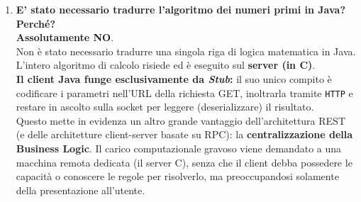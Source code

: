 \documentclass[11pt]{article}
\begin{document}
\begin{tcolorbox}[colback=green!5!white,colframe=green!75!black,title=\textbf{RISPOSTA}, breakable]
\begin{enumerate}
    \item \textbf{E' stato necessario tradurre l'algoritmo dei numeri primi in Java? Perché?}\\
    \textbf{Assolutamente NO}.\\
    Non è stato necessario tradurre una singola riga di logica matematica in Java. L'intero algoritmo di calcolo risiede ed è eseguito sul \textbf{server (in C)}.\\
    \textbf{Il client Java funge esclusivamente da \textit{Stub}:} il suo unico compito è codificare i parametri nell'URL della richiesta GET, inoltrarla tramite \texttt{HTTP} e restare in ascolto sulla socket per leggere (deserializzare) il risultato.\\
    Questo mette in evidenza un altro grande vantaggio dell'architettura REST (e delle architetture client-server basate su RPC): la \textbf{centralizzazione della Business Logic}. Il carico computazionale gravoso viene demandato a una macchina remota dedicata (il server C), senza che il client debba possedere le capacità o conoscere le regole per risolverlo, ma preoccupandosi solamente della presentazione all'utente.
\end{enumerate}
\end{tcolorbox}
\end{document}
